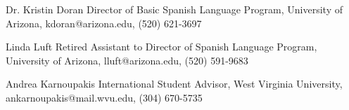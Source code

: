 


\begin{cvskills}


\cvskill
{Dr. Kristin Doran} %
{Director of Basic Spanish Language Program, 
University of Arizona, 
kdoran@arizona.edu, 
(520) 621-3697} %

\cvskill
{Linda Luft} %
{Retired Assistant to Director of Spanish Language Program, 
University of Arizona, 
lluft@arizona.edu, 
(520) 591-9683} %

\cvskill
{Andrea Karnoupakis} %
{International Student Advisor, 
West Virginia University, 
ankarnoupakis@mail.wvu.edu, 
(304) 670-5735} %


\vspace{-7mm}
\end{cvskills}